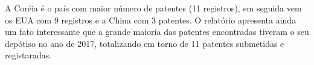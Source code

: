 
A Coréia é o país com maior número de patentes (11 registros), em seguida vem os EUA com 9 registros e a China com 3 patentes.
O relatório apresenta ainda um fato interessante que a grande maioria das patentes encontradas tiveram o seu depótiso no ano de 2017, totalizando em torno de 11 patentes submetidas e registaradas.


